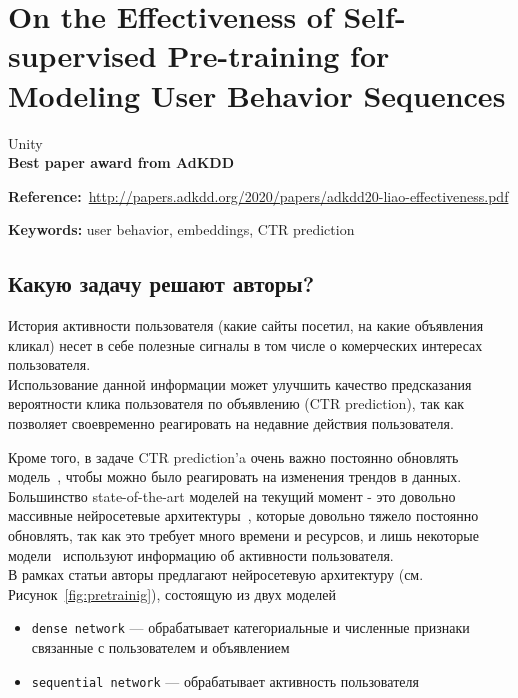 \chapter{On the Effectiveness of Self-supervised Pre-training for Modeling User Behavior Sequences}

Unity \\

\textbf{Best paper award from AdKDD}

\textbf{Reference:}~\url{http://papers.adkdd.org/2020/papers/adkdd20-liao-effectiveness.pdf}

\textbf{Keywords:} user behavior, embeddings, CTR prediction

\section{Какую задачу решают авторы?}

История активности пользователя (какие сайты посетил, на какие объявления кликал) несет в себе полезные сигналы в том числе о комерческих интересах пользователя. \\

Использование данной информации может улучшить качество предсказания вероятности клика пользователя по объявлению (CTR prediction), так как позволяет своевременно реагировать на недавние действия пользователя.

Кроме того, в задаче CTR prediction'a очень важно постоянно обновлять модель~\cite{he2014practical}, чтобы можно было реагировать на изменения трендов в данных. \\

Большинство state-of-the-art моделей на текущий момент - это довольно массивные нейросетевые архитектуры~\cite{guo2017deepfm,zhou2018deep,wang2017deep}, которые довольно тяжело постоянно обновлять, так как это требует много времени и ресурсов, и лишь некоторые модели~\cite{zhou2018deep} используют информацию об активности пользователя. \\

В рамках статьи авторы предлагают нейросетевую архитектуру (см. Рисунок~\ref{fig:pretrainig}), состоящую из двух моделей 
\begin{itemize}
    \item \texttt{dense network} --- обрабатывает категориальные и численные признаки связанные с пользователем и объявлением
    \item \texttt{sequential network} --- обрабатывает активность пользователя
\end{itemize}

